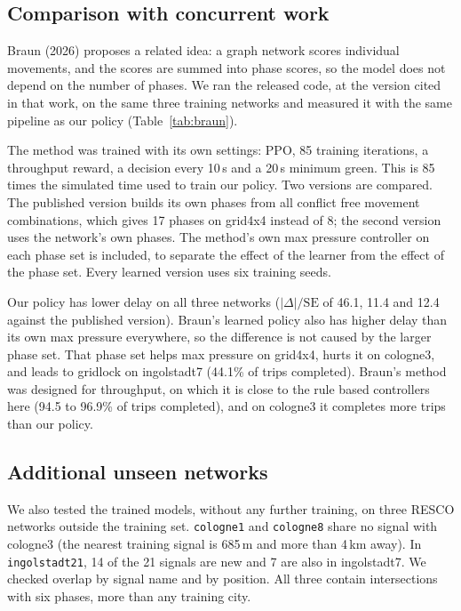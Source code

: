 \documentclass[10pt,twocolumn,a4paper]{article}
\begin{document}
\subsection{Comparison with concurrent work}
Braun (2026) proposes a related idea: a graph network scores individual movements, and
the scores are summed into phase scores, so the model does not depend on the number of
phases. We ran the released code, at the version cited in that work, on the same three
training networks and measured it with the same pipeline as our policy
(Table~\ref{tab:braun}).

The method was trained with its own settings: PPO, 85 training iterations, a throughput
reward, a decision every 10\,s and a 20\,s minimum green. This is 85 times the simulated
time used to train our policy. Two versions are compared. The published version builds its
own phases from all conflict free movement combinations, which gives 17 phases on grid4x4
instead of 8; the second version uses the network's own phases. The method's own max
pressure controller on each phase set is included, to separate the effect of the learner
from the effect of the phase set. Every learned version uses six training seeds.

Our policy has lower delay on all three networks ($|\Delta|/\mathrm{SE}$ of 46.1, 11.4 and
12.4 against the published version). Braun's learned policy also has higher delay than its
own max pressure everywhere, so the difference is not caused by the larger phase set. That
phase set helps max pressure on grid4x4, hurts it on cologne3, and leads to gridlock on
ingolstadt7 (44.1\% of trips completed). Braun's method was designed for throughput, on
which it is close to the rule based controllers here (94.5 to 96.9\% of trips completed),
and on cologne3 it completes more trips than our policy.



\subsection{Additional unseen networks}
We also tested the trained models, without any further training, on three RESCO networks
outside the training set. \texttt{cologne1} and \texttt{cologne8} share no signal with
cologne3 (the nearest training signal is 685\,m and more than 4\,km away). In
\texttt{ingolstadt21}, 14 of the 21 signals are new and 7 are also in ingolstadt7. We
checked overlap by signal name and by position. All three contain intersections with six
phases, more than any training city.
\end{document}
